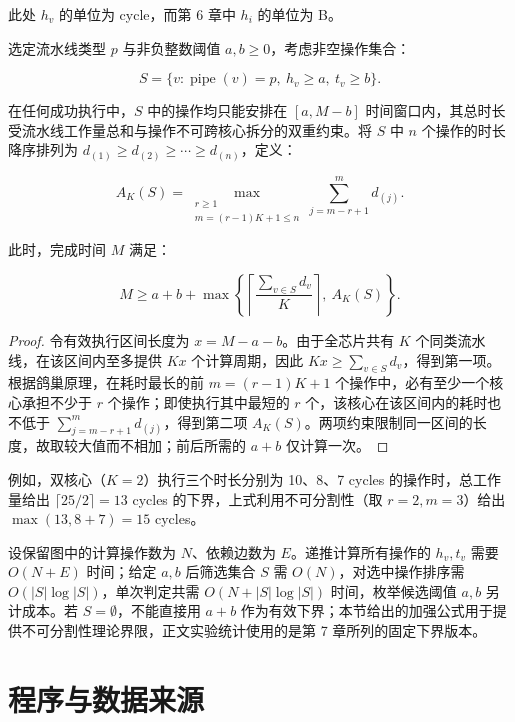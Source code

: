 \documentclass[anonymous,withtoc]{gmcm2026}
\begin{document}
此处 \(h_v\) 的单位为 cycle，而第 6 章中 \(h_i\) 的单位为 B。

选定流水线类型 \(p\) 与非负整数阈值 \(a, b \ge 0\)，考虑非空操作集合：

\begin{equation}
S = \{v: \operatorname{pipe}(v) = p, \ h_v \ge a, \ t_v \ge b\}.
\end{equation}

在任何成功执行中，\(S\) 中的操作均只能安排在 \([a, M - b]\) 时间窗口内，其总时长受流水线工作量总和与操作不可跨核心拆分的双重约束。将 \(S\) 中 \(n\) 个操作的时长降序排列为 \(d_{(1)} \ge d_{(2)} \ge \cdots \ge d_{(n)}\)，定义：

\begin{equation}
A_K(S) = \max_{\substack{r \ge 1 \\ m = (r-1)K+1 \le n}} \sum_{j=m-r+1}^{m} d_{(j)}.
\end{equation}

此时，完成时间 \(M\) 满足：

\begin{equation}
M \ge a + b + \max\left\{\left\lceil\frac{\sum_{v \in S} d_v}{K}\right\rceil, \ A_K(S)\right\}.
\end{equation}

\begin{proof} 令有效执行区间长度为 \(x = M - a - b\)。由于全芯片共有 \(K\) 个同类流水线，在该区间内至多提供 \(Kx\) 个计算周期，因此 \(Kx \ge \sum_{v \in S} d_v\)，得到第一项。根据鸽巢原理，在耗时最长的前 \(m = (r-1)K + 1\) 个操作中，必有至少一个核心承担不少于 \(r\) 个操作；即使执行其中最短的 \(r\) 个，该核心在该区间内的耗时也不低于 \(\sum_{j=m-r+1}^{m} d_{(j)}\)，得到第二项 \(A_K(S)\)。两项约束限制同一区间的长度，故取较大值而不相加；前后所需的 \(a + b\) 仅计算一次。 \end{proof}

例如，双核心（\(K=2\)）执行三个时长分别为 10、8、7 cycles 的操作时，总工作量给出 \(\lceil 25/2 \rceil = 13\) cycles 的下界，上式利用不可分割性（取 \(r=2, m=3\)）给出 \(\max(13, 8+7) = 15\) cycles。

设保留图中的计算操作数为 \(N\)、依赖边数为 \(E\)。递推计算所有操作的 \(h_v, t_v\) 需要 \(O(N + E)\) 时间；给定 \(a, b\) 后筛选集合 \(S\) 需 \(O(N)\)，对选中操作排序需 \(O(|S| \log |S|)\)，单次判定共需 \(O(N + |S| \log |S|)\) 时间，枚举候选阈值 \(a, b\) 另计成本。若 \(S = \emptyset\)，不能直接用 \(a + b\) 作为有效下界；本节给出的加强公式用于提供不可分割性理论界限，正文实验统计使用的是第 7 章所列的固定下界版本。

\section{程序与数据来源}
\end{document}
